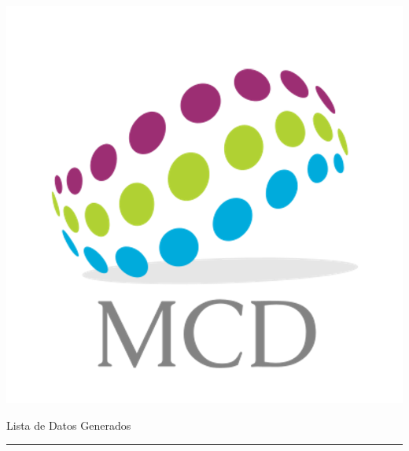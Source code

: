 \documentclass{article}
\begin{document}


\vspace{-1em} %


\bigskip\bigskip %



\begin{center}
    \includegraphics[scale=0.05]{mcdlogo.png}

{\Large Lista de Datos Generados\par}
\end{center}
\rule{\linewidth}{1pt} %
\end{document}
